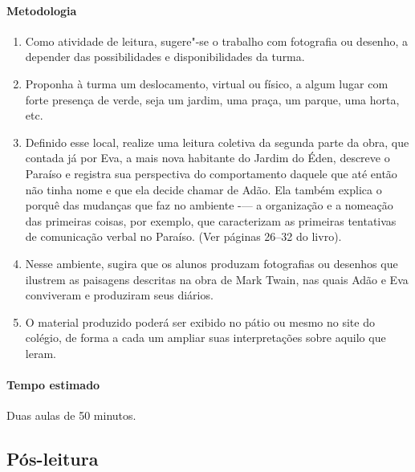 \documentclass[12pt]{extarticle}
\begin{document}
\paragraph{Metodologia}

\begin{enumerate}
\item
Como atividade de leitura, sugere"-se o trabalho com fotografia ou
desenho, a depender das possibilidades e disponibilidades da turma. 

\item
Proponha à turma um deslocamento, virtual ou físico, a algum lugar com forte presença 
de verde, seja um jardim, uma praça, um parque, uma horta, etc. 

\item
Definido esse local, realize uma leitura coletiva da segunda parte da obra, que contada já por Eva, a mais
nova habitante do Jardim do Éden, descreve o Paraíso e registra
sua perspectiva do comportamento daquele que até
então não tinha nome e que ela decide chamar de Adão. Ela
também explica o porquê das mudanças que faz no ambiente -— a organização e a nomeação das 
primeiras coisas, por exemplo, que caracterizam as primeiras tentativas de comunicação
verbal no Paraíso. (Ver páginas 26--32 do livro). 

\item
Nesse ambiente, sugira que os alunos produzam fotografias ou desenhos que ilustrem as paisagens
descritas na obra de Mark Twain, nas quais Adão e Eva conviveram e
produziram seus diários. 

\item
O material produzido poderá ser exibido no
pátio ou mesmo no site do colégio, de forma a cada um ampliar suas interpretações sobre aquilo que leram.

\end{enumerate}

\paragraph{Tempo estimado} Duas aulas de 50 minutos. 



\subsection{Pós-leitura}
\end{document}

